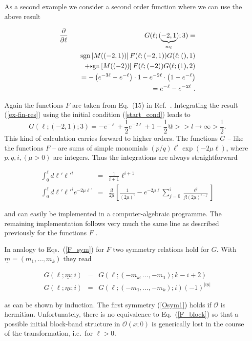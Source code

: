 As a second example we consider a second order function where we can
use the above result
\begin{mathletters}
\label{example_2}
\begin{eqnarray}
  \nonumber
  \frac{\partial}{\partial \ell}
  &&G(\ell;(\underbrace{-2,1}_{m_l});3)=\\\nonumber
  &&\hspace*{2mm}{\rm sgn}\left[M((-2,1))\right]F(\ell;(-2,1))
    G(\ell;(),1)\\
  &&\hspace*{5mm}+{\rm sgn}\left[M((-2))\right]F(\ell;(-2))
  G(\ell;(1),2)\\
  &&=-\left(e^{-3\ell}-e^{-\ell}\right)\cdot 1 - e^{-2\ell}\cdot
  \left(1-e^{-\ell}\right)\\
  &&=e^{-\ell}-e^{-2\ell}\label{ex-fin-res}
\ .
\end{eqnarray}
\end{mathletters}
Again the functions $F$ are taken from Eq.~(15) in Ref.~.
Integrating the result (\ref{ex-fin-res}) using the initial
condition (\ref{start_cond}) leads to
\begin{equation}
  \label{ex_2_res}
  G(\ell;(-2,1);3)=-e^{-\ell}+\textstyle\frac{1}{2}e^{-2\ell}
+1-\textstyle\frac{1}{2}
  @>>{l\rightarrow\infty}>\textstyle\frac{1}{2} .
\end{equation}
This kind of calculation carries forward to higher orders. The
functions $G$ -- like the functions $F$ -- are sums of simple monomials  
$(p/q)\ell^i\exp(-2\mu \ell)$, where $p,q,i,(\mu>0)$ are integers. 
 Thus the  integrations are always straightforward
\begin{mathletters}
\begin{eqnarray}
  \int_0^{\ell} d\ell' {\ell'}^i &=& {\textstyle\frac{1}{i+1}}\ell^{i+1}\\
  \int_0^{\ell} d\ell' {\ell'}^i e^{-2\mu \ell'} &=& 
{\frac{i!}{2\mu}}\left[{\textstyle\frac{1}{(2\mu)^i}}-
e^{-2\mu \ell}\sum_{j=0}^i\textstyle\frac{\ell^j}{j! (2\mu)^{i-j}}\right]
\end{eqnarray}
\end{mathletters}
and can easily be implemented in a computer-algebraic programme.
The remaining implementation follows very much the same line as
described previously for the functions $F$ \cite{knett00a}.

In analogy to Eqs.~(\ref{F_sym}) for $F$  two symmetry relations hold for $G$.
With ${\underline m}=(m_1,\ldots,m_k)$ they read
\begin{mathletters}
\label{G_sym}
\begin{eqnarray}\label{Osym1}
  G(\ell;{\underline m};i)&=&
  G(\ell;(-m_k,\ldots,-m_1);k-i+2)\\\label{Osym2}
  G(\ell;{\underline m};i)&=&
  G(\ell;(-m_1,\ldots,-m_k);i)(-1)^{|\underline m|}
\end{eqnarray} 
\end{mathletters}
as can be shown by induction.
The first symmetry (\ref{Osym1}) holds if  ${\mathcal O}$ is hermitian. 
Unfortunately, there is no equivalence to Eq.~(\ref{F_block}) so that a
possible initial block-band structure in ${\mathcal O}(x;0)$ is generically
 lost in the course of the transformation, i.e.\ for $\ell >0$.

